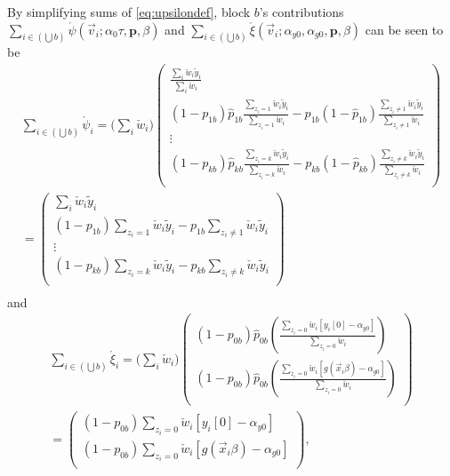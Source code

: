 \documentclass{article}
\newcommand{\owt}[1][{[z_{i}]}]{\ensuremath{\check{w}_{i#1}}}
\begin{document}
By simplifying sums of \eqref{eq:upsilondef},  block $b$'s contributions
$\sum_{i \in (\bigcup b)} \acute{\psi}(\vec{v}_{i};
\alpha_{0} \tau,
\mathbf{p}, \beta)$ and
$\sum_{i \in (\bigcup b)} \acute{\xi}(\vec{v}_{i};
\alpha_{y0}, \alpha_{g0}, \mathbf{p}, \beta)$ can be seen to be 
\begin{multline}

  \sum_{i \in (\bigcup b)}\acute{\psi}_{i}=  \big(\sum_{i} \owt[]\big)
        \left(
          \begin{array}{c}
            \frac{\sum_{i}\owt[]\tilde{y}_{i}}{\sum_{i} \owt[]}\\
         {} (1-{p}_{1b})
            \hat{p}_{1b}\frac{\sum_{{z_i=1}}\owt[]\tilde{y}_{i}}{\sum_{{z_i=1}}\owt[]}  -
      p_{1b}(1-\hat{p}_{1b})\frac{\sum_{{z_i\neq
            1}}\owt[]\tilde{y}_{i}}{\sum_{{z_i\neq 1}}\owt[]}\\
      \vdots\\
         {}
            (1-{p}_{kb})\hat{p}_{kb}\frac{\sum_{{z_i=k}}\owt[]\tilde{y}_{i}}{\sum_{{z_i=k}}\owt[]}  -
      p_{kb}(1-\hat{p}_{kb})\frac{\sum_{{z_i\neq
            k}}\owt[]\tilde{y}_{i}}{\sum_{{z_i\neq k}}\owt[]} \\
          \end{array}
        \right)\\
= 
        \left(
          \begin{array}{c}
            \sum_{i}\owt[]\tilde{y}_{i}\\
         {} (1-{p}_{1b})
            {\sum_{{z_i=1}}\owt[]\tilde{y}_{i}}  -
      p_{1b}{\sum_{{z_i\neq
            1}}\owt[]\tilde{y}_{i}}\\
      \vdots\\
         {}
            (1-{p}_{kb}){\sum_{{z_i=k}}\owt[]\tilde{y}_{i}}  -
      p_{kb}{\sum_{{z_i\neq
            k}}\owt[]\tilde{y}_{i}} \\
          \end{array}
        \right)\\
  \label{eq:31}
\end{multline}
and
\begin{multline}\label{eq:34}
\sum_{i \in (\bigcup b)}\acute{\xi}_{i}=  \big(\sum_{i} \owt[]\big)
\begin{pmatrix}
              (1-{p}_{0b})
            \hat{p}_{0b}\left(\frac{\sum_{{z_i=0}}\owt[][y_{i}[0] -\alpha_{y0}] }{\sum_{{z_i=0}}\owt[]}
            \right)\\
              (1-{p}_{0b})
            \hat{p}_{0b}\left(\frac{\sum_{{z_i=0}}\owt[][g(\vec{x}_{i}\beta)-\alpha_{g0}] }{\sum_{{z_i=0}}\owt[]}
            \right)\\
\end{pmatrix}\\
=
\begin{pmatrix}
              (1-{p}_{0b})
            {\sum_{{z_i=0}}\owt[] [y_{i}[0] -\alpha_{y0}]}
            \\
              (1-{p}_{0b})
            {\sum_{{z_i=0}}\owt[] [g(\vec{x}_{i}\beta)-\alpha_{g0}]}
  \\
\end{pmatrix},
\end{multline}
\end{document}
